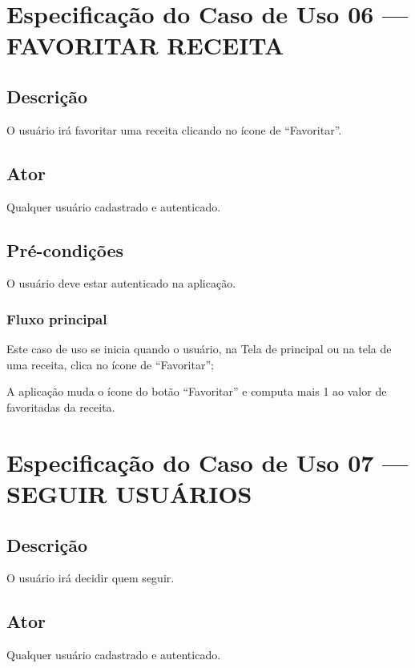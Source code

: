 \section*{Especificação do Caso de Uso 06 --- FAVORITAR RECEITA}
\subsection*{Descrição}
O usuário irá favoritar uma receita clicando no ícone de “Favoritar”.

\subsection*{Ator}
Qualquer usuário cadastrado e autenticado.

\subsection*{Pré-condições}
O usuário deve estar autenticado na aplicação. 

\subsubsection*{Fluxo principal}
\begin{lista}
	\item Este caso de uso se inicia quando o usuário, na Tela de principal ou na tela de uma receita, clica no ícone de “Favoritar”;
    \item A aplicação muda o ícone do botão “Favoritar” e computa mais 1 ao valor de favoritadas da receita.
\end{lista}
\pagebreak


\section*{Especificação do Caso de Uso 07 --- SEGUIR USUÁRIOS}
\subsection*{Descrição}
O usuário irá decidir quem seguir.

\subsection*{Ator}
Qualquer usuário cadastrado e autenticado.

